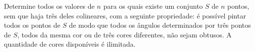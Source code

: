 Determine todos os valores de $n$ para os quais existe um conjunto $S$ de $n$ pontos, sem que haja três deles colineares, com a seguinte propriedade: é possível pintar todos os pontos de $S$ de modo que todos os ângulos determinados por três pontos de $S$, todos da mesma cor ou de três cores diferentes, não sejam obtusos. A quantidade de cores disponíveis é ilimitada.